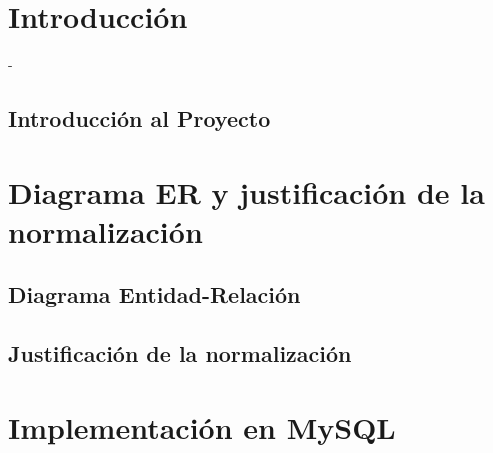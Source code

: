 \documentclass[12pt]{article}
\begin{document}


\tableofcontents
\newpage

\section{Introducción}-
\subsection{Introducción al Proyecto}


\section{Diagrama ER y justificación de la normalización}

\subsection{Diagrama Entidad-Relación}


\subsection{Justificación de la normalización}


\section{Implementación en MySQL}

\end{document}
